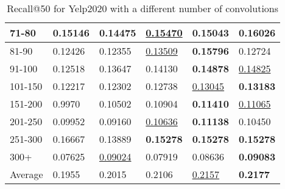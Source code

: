\begin{table*}[]
\begin{tabular}{|l|l|l|l|l|l|}
        71-80     & 0.15146                    & 0.14475                    & \underline{0.15470}        & 0.15043                    & \textbf{0.16026}           \\ \hline
        81-90     & 0.12426                    & 0.12355                    & \underline{0.13509}        & \textbf{0.15796}           & 0.12724                    \\ \hline
        91-100    & 0.12518                    & 0.13647                    & 0.14130                    & \textbf{0.14878}           & \underline{0.14825}        \\ \hline
        101-150   & 0.12217                    & 0.12302                    & 0.12738                    & \underline{0.13045}        & \textbf{0.13183}           \\ \hline
        151-200   & 0.9970                     & 0.10502                    & 0.10904                    & \textbf{0.11410}           & \underline{0.11065}        \\ \hline
        201-250   & 0.09952                    & 0.09160                    & \underline{0.10636}        & \textbf{0.11138}           & 0.10450                    \\ \hline
        251-300   & 0.16667                    & 0.13889                    & \textbf{0.15278}           & \textbf{0.15278}           & \textbf{0.15278}           \\ \hline
        300+      & 0.07625                    & \underline{0.09024}        & 0.07919                    & 0.08636                    & \textbf{0.09083}           \\ \hline
        Average   & 0.1955                     & 0.2015                     & 0.2106                     & \underline{0.2157}         & \textbf{0.2177}            \\ \hline
    \end{tabular}
    \caption{Recall@50 for Yelp2020 with a different number of convolutions}
    \centering
    \label{tab:Yelp2020-recall-evaluation-mean}
\end{table*}

